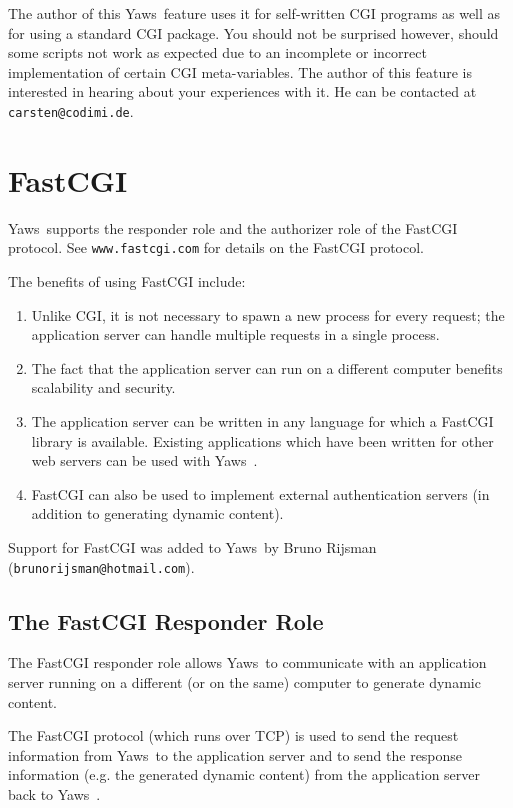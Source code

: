 \documentclass[11pt,oneside,english]{book}
\newcommand{\Yaws}            %
        {{\sc Yaws}}
\begin{document}
The author of this \Yaws\  feature uses it for self-written CGI programs
as well as for using a standard CGI package.  You should not be
surprised however, should some scripts not work as expected due to an
incomplete or incorrect implementation of certain CGI meta-variables.
The author of this feature is interested in hearing about your
experiences with it.  He can be contacted at \verb+carsten@codimi.de+.

\chapter{FastCGI}

\Yaws\  supports the responder role and the authorizer role of the
FastCGI protocol. See \verb+www.fastcgi.com+ for details on the
FastCGI protocol.

The benefits of using FastCGI include:
\begin{enumerate}
\item Unlike CGI, it is not necessary to spawn a new process for
every request; the application server can handle multiple requests
in a single process.
\item The fact that the application server can run on a different
computer benefits scalability and security.
\item The application server can be written in any language for
which a FastCGI library is available. Existing applications
which have been written for other web servers can be used with
\Yaws\ .
\item FastCGI can also be used to implement external authentication
servers (in addition to generating dynamic content).
\end{enumerate}

Support for FastCGI was added to \Yaws\  by Bruno Rijsman
(\verb+brunorijsman@hotmail.com+).

\section{The FastCGI Responder Role}

The FastCGI responder role allows \Yaws\  to communicate with an
application server running on a different (or on the same) computer
to generate dynamic content.

The FastCGI protocol (which runs over TCP) is used to send the request
information from \Yaws\  to the application server and to send the
response information (e.g. the generated dynamic content) from
the application server back to \Yaws\ .
\end{document}
